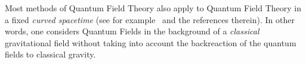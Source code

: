 \documentclass[reqno,11pt]{amsart}
\numberwithin{equation}{section}
\newcommand{\1}{\mbox{\rm 1 \hspace{-1.05 em} 1}}
\begin{document}
Most methods of Quantum Field Theory also apply to Quantum Field Theory in a
fixed {\em{curved spacetime}} (see for example~\cite{brunetti+fredenhagenQFT}
and the references therein).
In other words, one considers Quantum Fields in
the background of a {\em{classical}} gravitational field
without taking into account the backreaction of the quantum fields
to classical gravity.

%
%
%
%
%
%
%
%
%
%
%

\end{document}
